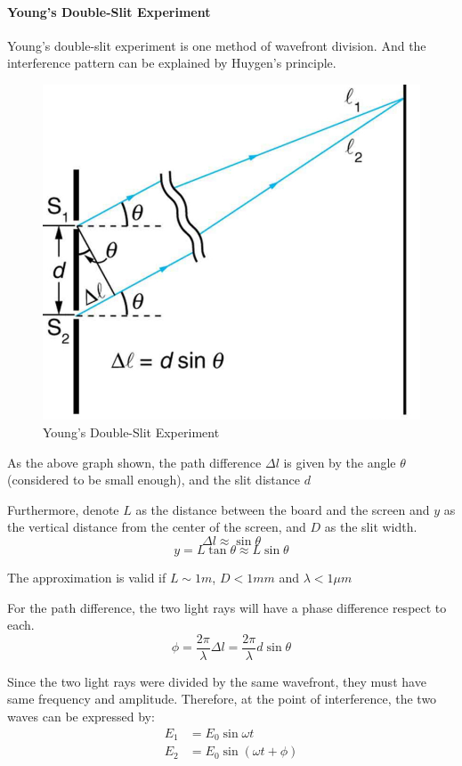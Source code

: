 \documentclass[openany]{book}
\begin{document}
\paragraph{Young's Double-Slit Experiment}
Young's double-slit experiment is one method of wavefront division. And the interference pattern can be explained by Huygen's principle. 
\begin{figure}[H]
\centering
\label{fig:17}
\includegraphics[scale=0.5]{Figure/17.PNG}
\caption{Young's Double-Slit Experiment}
\end{figure}
As the above graph shown, the path difference $\Delta l$ is given by the angle $\theta $ (considered to be small enough), and the slit distance $d$

Furthermore, denote $L$ as the distance between the board and the screen and $y$ as the vertical distance from the center of the screen, and $D$ as the slit width. 
\[\Delta l\approx \sin \theta \]
\[y =L\tan \theta \approx L\sin \theta \]

The approximation is valid if $L\sim 1m$, $D < 1mm$ and $\lambda < 1\mu m$

For the path difference, the two light rays will have a phase difference respect to each. 
\[\phi =\frac{2\pi }{\lambda }\Delta l=\frac{2\pi }{\lambda }d\sin \theta\]

Since the two light rays were divided by the same wavefront, they must have same frequency and amplitude. Therefore, at the point of interference, the two waves can be expressed by:
\begin{align*}
E_1&=E_0\sin \omega t\\
E_2&=E_0\sin (\omega t+\phi )
\end{align*}
\end{document}
